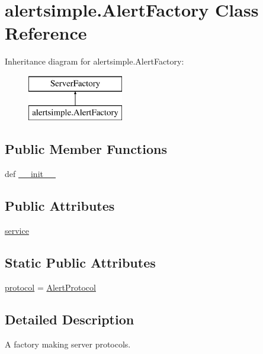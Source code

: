\hypertarget{classalertsimple_1_1_alert_factory}{\section{alertsimple.\-Alert\-Factory Class Reference}
\label{classalertsimple_1_1_alert_factory}
}
Inheritance diagram for alertsimple.\-Alert\-Factory\-:\begin{figure}[H]
\begin{center}
\leavevmode
\includegraphics[height=2.000000cm]{classalertsimple_1_1_alert_factory}
\end{center}
\end{figure}
\subsection*{Public Member Functions}
\begin{DoxyCompactItemize}
\item 
def \hyperlink{classalertsimple_1_1_alert_factory_ad7d79d5bbd7124238dfd97655b0606ba}{\-\_\-\-\_\-init\-\_\-\-\_\-}
\end{DoxyCompactItemize}
\subsection*{Public Attributes}
\begin{DoxyCompactItemize}
\item 
\hyperlink{classalertsimple_1_1_alert_factory_ad63601528dbc68ada0dbbd9078e39205}{service}
\end{DoxyCompactItemize}
\subsection*{Static Public Attributes}
\begin{DoxyCompactItemize}
\item 
\hyperlink{classalertsimple_1_1_alert_factory_a5f1be1638587121071aac8f909c3494d}{protocol} = \hyperlink{classalertsimple_1_1_alert_protocol}{Alert\-Protocol}
\end{DoxyCompactItemize}


\subsection{Detailed Description}
\begin{DoxyVerb}A factory making server protocols.
\end{DoxyVerb}
 

